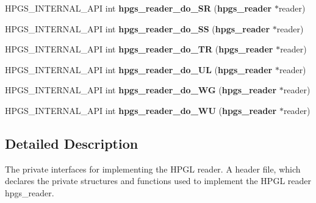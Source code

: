 \begin{DoxyCompactItemize}
\item 
HPGS\_\-INTERNAL\_\-API int {\bfseries hpgs\_\-reader\_\-do\_\-SR} ({\bf hpgs\_\-reader} $\ast$reader)\label{group__reader_ga4a24948f7c51bcd66eef03287ee32817}

\item 
HPGS\_\-INTERNAL\_\-API int {\bfseries hpgs\_\-reader\_\-do\_\-SS} ({\bf hpgs\_\-reader} $\ast$reader)\label{group__reader_gaf1ec4288bbddaab160fbbd62087657ea}

\item 
HPGS\_\-INTERNAL\_\-API int {\bfseries hpgs\_\-reader\_\-do\_\-TR} ({\bf hpgs\_\-reader} $\ast$reader)\label{group__reader_ga1d1fef69731ae8b75b6e8888dc3d4e09}

\item 
HPGS\_\-INTERNAL\_\-API int {\bfseries hpgs\_\-reader\_\-do\_\-UL} ({\bf hpgs\_\-reader} $\ast$reader)\label{group__reader_ga9d7b05da59f6c4ffe747bfeba933f753}

\item 
HPGS\_\-INTERNAL\_\-API int {\bfseries hpgs\_\-reader\_\-do\_\-WG} ({\bf hpgs\_\-reader} $\ast$reader)\label{group__reader_ga5c79a4c2eeda221339afbd0b4d1e3007}

\item 
HPGS\_\-INTERNAL\_\-API int {\bfseries hpgs\_\-reader\_\-do\_\-WU} ({\bf hpgs\_\-reader} $\ast$reader)\label{group__reader_ga53cfcda314a1990582befe9a02ec2038}

\end{DoxyCompactItemize}


\subsection{Detailed Description}
The private interfaces for implementing the HPGL reader. A header file, which declares the private structures and functions used to implement the HPGL reader {\ttfamily hpgs\_\-reader}. 